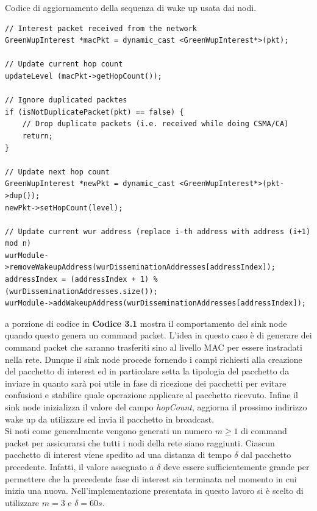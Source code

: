 \documentclass[binding=0.6cm,TFA]{sapthesis}
\begin{document}
\begin{listing}
    \caption{Codice di aggiornamento della sequenza di wake up usata dai nodi.}
    \begin{verbatim}
// Interest packet received from the network
GreenWupInterest *macPkt = dynamic_cast <GreenWupInterest*>(pkt);

// Update current hop count
updateLevel (macPkt->getHopCount());

// Ignore duplicated packtes
if (isNotDuplicatePacket(pkt) == false) {
    // Drop duplicate packets (i.e. received while doing CSMA/CA)
    return;
}

// Update next hop count
GreenWupInterest *newPkt = dynamic_cast <GreenWupInterest*>(pkt->dup());
newPkt->setHopCount(level);

// Update current wur address (replace i-th address with address (i+1) mod n)
wurModule->removeWakeupAddress(wurDisseminationAddresses[addressIndex]);
addressIndex = (addressIndex + 1) % (wurDisseminationAddresses.size());
wurModule->addWakeupAddress(wurDisseminationAddresses[addressIndex]);

    \end{verbatim}
\end{listing}

\let\cleardoublepage    %

La porzione di codice in \textbf{Codice 3.1} mostra il comportamento del sink node quando questo genera un command packet. L'idea in questo caso è
di generare dei command packet che saranno trasferiti sino al livello MAC per essere instradati nella rete. Dunque il sink node procede
fornendo i campi richiesti alla creazione del pacchetto di interest ed in particolare setta la tipologia del pacchetto da inviare in quanto sarà poi
utile in fase di ricezione dei pacchetti per evitare confusioni e stabilire quale operazione applicare al pacchetto ricevuto.
Infine il sink node inizializza il valore del campo \emph{hopCount}, aggiorna il prossimo indirizzo wake up da utilizzare ed invia il pacchetto in broadcast.\\

\newpage
Si noti come generalmente vengono generati un numero $m \geq 1 $ di command packet per assicurarsi che tutti i nodi della rete siano raggiunti. Ciascun pacchetto
di interest viene spedito ad una distanza di tempo $\delta$ dal pacchetto precedente. Infatti, il valore assegnato a $\delta$ deve essere sufficientemente
grande per permettere che la precedente fase di interest sia terminata nel momento in cui inizia una nuova. Nell'implementazione presentata in questo lavoro
si è scelto di utilizzare $m=3$ e $\delta=60s$.\\
\end{document}
